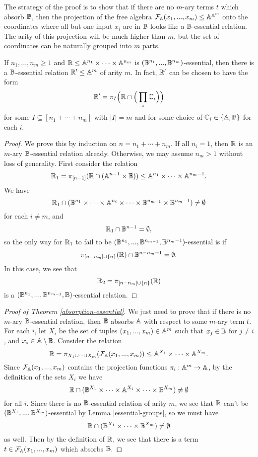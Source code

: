 \documentclass[letterpaper,11pt]{article}
\begin{document}
The strategy of the proof is to show that if there are no $m$-ary terms $t$ which absorb $\mathbb{B}$, then the projection of the free algebra $\mathcal{F}_{\mathbb{A}}(x_1, ..., x_m) \le \mathbb{A}^{\mathbb{A}^m}$ onto the coordinates where all but one input $x_i$ are in $\mathbb{B}$ looks like a $\mathbb{B}$-essential relation. The arity of this projection will be much higher than $m$, but the set of coordinates can be naturally grouped into $m$ parts.

\begin{lem}\label{essential-groups} If $n_1, ..., n_m \ge 1$ and $\mathbb{R} \le \mathbb{A}^{n_1}\times \cdots \times \mathbb{A}^{n_m}$ is $(\mathbb{B}^{n_1}, ..., \mathbb{B}^{n_m})$-essential, then there is a $\mathbb{B}$-essential relation $\mathbb{R}' \le \mathbb{A}^m$ of arity $m$. In fact, $\mathbb{R}'$ can be chosen to have the form
\[
\mathbb{R}' = \pi_I\Big(\mathbb{R} \cap \Big(\prod_i \mathbb{C}_i\Big)\Big)
\]
for some $I \subseteq [n_1 + \cdots + n_m]$ with $|I| = m$ and for some choice of $\mathbb{C}_i \in \{\mathbb{A}, \mathbb{B}\}$ for each $i$.
\end{lem}
\begin{proof} We prove this by induction on $n = n_1 + \cdots + n_m$. If all $n_i = 1$, then $\mathbb{R}$ is an $m$-ary $\mathbb{B}$-essential relation already. Otherwise, we may assume $n_m > 1$ without loss of generality. First consider the relation
\[
\mathbb{R}_1 = \pi_{[n-1]}(\mathbb{R} \cap (\mathbb{A}^{n-1}\times \mathbb{B})) \le \mathbb{A}^{n_1}\times \cdots \times \mathbb{A}^{n_m-1}.
\]
We have
\[
\mathbb{R}_1 \cap (\mathbb{B}^{n_1}\times \cdots \times \mathbb{A}^{n_i} \times \cdots \times \mathbb{B}^{n_{m-1}} \times \mathbb{B}^{n_m-1}) \ne \emptyset
\]
for each $i \ne m$, and
\[
\mathbb{R}_1 \cap \mathbb{B}^{n-1} = \emptyset,
\]
so the only way for $\mathbb{R}_1$ to fail to be $(\mathbb{B}^{n_1}, ..., \mathbb{B}^{n_{m-1}}, \mathbb{B}^{n_m-1})$-essential is if
\[
\pi_{[n-n_m]\cup\{n\}}(\mathbb{R}) \cap \mathbb{B}^{n-n_m+1} = \emptyset.
\]
In this case, we see that
\[
\mathbb{R}_2 = \pi_{[n-n_m]\cup\{n\}}(\mathbb{R})
\]
is a $(\mathbb{B}^{n_1}, ..., \mathbb{B}^{n_{m-1}}, \mathbb{B})$-essential relation.
\end{proof}

\begin{proof}[Proof of Theorem \ref{absorption-essential}] We just need to prove that if there is no $m$-ary $\mathbb{B}$-essential relation, then $\mathbb{B}$ absorbs $\mathbb{A}$ with respect to some $m$-ary term $t$. For each $i$, let $X_i$ be the set of tuples $(x_1, ..., x_m) \in \mathbb{A}^m$ such that $x_j \in \mathbb{B}$ for $j \ne i$, and $x_i \in \mathbb{A}\setminus \mathbb{B}$. Consider the relation
\[
\mathbb{R} = \pi_{X_1 \cup \cdots \cup X_m} (\mathcal{F}_{\mathbb{A}}(x_1, ..., x_m)) \le \mathbb{A}^{X_1} \times \cdots \times \mathbb{A}^{X_m}.
\]
Since $\mathcal{F}_{\mathbb{A}}(x_1, ..., x_m)$ contains the projection functions $\pi_i : \mathbb{A}^m \rightarrow \mathbb{A}$, by the definition of the sets $X_i$ we have
\[
\mathbb{R} \cap (\mathbb{B}^{X_1} \times \cdots \times \mathbb{A}^{X_i} \times \cdots \times \mathbb{B}^{X_m}) \ne \emptyset
\]
for all $i$. Since there is no $\mathbb{B}$-essential relation of arity $m$, we see that $\mathbb{R}$ can't be $(\mathbb{B}^{X_1}, ..., \mathbb{B}^{X_m})$-essential by Lemma \ref{essential-groups}, so we must have
\[
\mathbb{R} \cap (\mathbb{B}^{X_1} \times \cdots \times \mathbb{B}^{X_m}) \ne \emptyset
\]
as well. Then by the definition of $\mathbb{R}$, we see that there is a term $t \in \mathcal{F}_{\mathbb{A}}(x_1, ..., x_m)$ which absorbs $\mathbb{B}$.
\end{proof}
\end{document}
